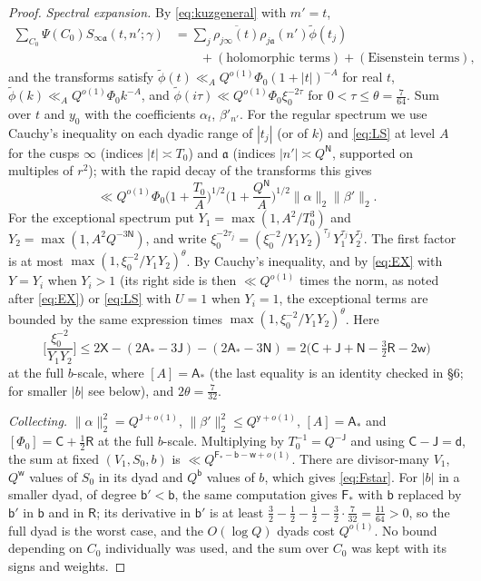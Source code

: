 \documentclass[11pt,colorlinks]{charlie}
\begin{document}
\begin{proof}
\emph{Spectral expansion.} By \eqref{eq:kuzgeneral} with $m'=t$,
\[
 \begin{split}
 \sum_{C_0}\Psi(C_0)S_{\infty\mathfrak a}(t,n';\gamma)&=\sum_j\overline{\rho_{j\infty}(t)}\rho_{j\mathfrak a}(n')\widetilde\phi(t_j)\\
 &\qquad+(\text{holomorphic terms})+(\text{Eisenstein terms}),
 \end{split}
\]
and the transforms satisfy $\widetilde\phi(t)\ll_AQ^{o(1)}\Phi_0(1+|t|)^{-A}$ for real $t$, $\widetilde\phi(k)\ll_AQ^{o(1)}\Phi_0k^{-A}$, and $\widetilde\phi(i\tau)\ll Q^{o(1)}\Phi_0\xi_0^{-2\tau}$ for $0<\tau\le\theta=\frac7{64}$. Sum over $t$ and $y_0$ with the coefficients $\alpha_t$, $\beta'_{n'}$. For the regular spectrum we use Cauchy's inequality on each dyadic range of $|t_j|$ (or of $k$) and \eqref{eq:LS} at level $A$ for the cusps $\infty$ (indices $|t|\asymp T_0$) and $\mathfrak a$ (indices $|n'|\asymp Q^{\mathsf N}$, supported on multiples of $r^2$); with the rapid decay of the transforms this gives
\[
 \ll Q^{o(1)}\Phi_0\Big(1+\frac{T_0}A\Big)^{1/2}\Big(1+\frac{Q^{\mathsf N}}A\Big)^{1/2}\|\alpha\|_2\|\beta'\|_2 .
\]
For the exceptional spectrum put $Y_1=\max(1,A^2/T_0^3)$ and $Y_2=\max(1,A^2Q^{-3\mathsf N})$, and write $\xi_0^{-2\tau_j}=(\xi_0^{-2}/Y_1Y_2)^{\tau_j}\,Y_1^{\tau_j}Y_2^{\tau_j}$. The first factor is at most $\max(1,\xi_0^{-2}/Y_1Y_2)^{\theta}$. By Cauchy's inequality, and by \eqref{eq:EX} with $Y=Y_i$ when $Y_i>1$ (its right side is then $\ll Q^{o(1)}$ times the norm, as noted after \eqref{eq:EX}) or \eqref{eq:LS} with $U=1$ when $Y_i=1$, the exceptional terms are bounded by the same expression times $\max(1,\xi_0^{-2}/Y_1Y_2)^{\theta}$. Here
\[
 \Big[\frac{\xi_0^{-2}}{Y_1Y_2}\Big]\le2\mathsf X-(2\mathsf A_*-3\mathsf J)-(2\mathsf A_*-3\mathsf N)=2\big(\mathsf C+\mathsf J+\mathsf N-\tfrac32\mathsf R-2\mathsf w\big)
\]
at the full $b$-scale, where $[A]=\mathsf A_*$ (the last equality is an identity checked in \S6; for smaller $|b|$ see below), and $2\theta=\frac7{32}$.

\emph{Collecting.} $\|\alpha\|_2^2=Q^{\mathsf J+o(1)}$, $\|\beta'\|_2^2\le Q^{\mathsf y+o(1)}$, $[A]=\mathsf A_*$ and $[\Phi_0]=\mathsf C+\frac12\mathsf R$ at the full $b$-scale. Multiplying by $T_0^{-1}=Q^{-\mathsf J}$ and using $\mathsf C-\mathsf J=\mathsf d$, the sum at fixed $(V_1,S_0,b)$ is $\ll Q^{\mathsf F_*-\mathsf b-\mathsf w+o(1)}$. There are divisor-many $V_1$, $Q^{\mathsf w}$ values of $S_0$ in its dyad and $Q^{\mathsf b}$ values of $b$, which gives \eqref{eq:Fstar}. For $|b|$ in a smaller dyad, of degree $\mathsf b'<\mathsf b$, the same computation gives $\mathsf F_*$ with $\mathsf b$ replaced by $\mathsf b'$ in $\mathsf b$ and in $\mathsf R$; its derivative in $\mathsf b'$ is at least $\frac32-\frac12-\frac12-\frac32\cdot\frac7{32}=\frac{11}{64}>0$, so the full dyad is the worst case, and the $O(\log Q)$ dyads cost $Q^{o(1)}$. No bound depending on $C_0$ individually was used, and the sum over $C_0$ was kept with its signs and weights.
\end{proof}
\end{document}

